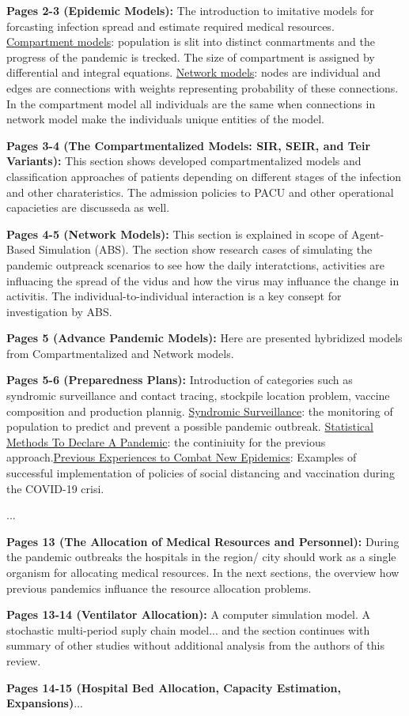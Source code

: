     \textbf{Pages 2-3 (Epidemic Models):}
    The introduction to imitative models for forcasting infection spread and estimate required medical resources. \underline{Compartment models}: population is slit into distinct conmartments and the progress of the pandemic is trecked. The size of compartment is assigned by differential and integral equations. \underline{Network models}: nodes are individual and edges are connections with weights representing probability of these connections. In the compartment model all individuals are the same when connections in network model make the individuals unique entities of the model.

    \textbf{Pages 3-4 (The Compartmentalized Models: SIR, SEIR, and Teir Variants):} 
    This section shows developed compartmentalized models and classification approaches of patients depending on different stages of the infection and other charateristics. The admission policies to PACU and other operational capacieties are discusseda as well.

    \textbf{Pages 4-5 (Network Models):} 
    This section is explained in scope of Agent-Based Simulation (ABS). The section show research cases of simulating the pandemic outpreack scenarios to see how the daily interatctions, activities are influacing the spread of the vidus and how the virus may influance the change in activitis. The individual-to-individual interaction is a key consept for investigation by ABS.
    
    \textbf{Pages 5 (Advance Pandemic Models):}
    Here are presented hybridized models from Compartmentalized and Network models. 
    
    \textbf{Pages 5-6 (Preparedness Plans):}
    Introduction of categories such as syndromic surveillance and contact tracing, stockpile location problem, vaccine composition and production plannig. \underline{Syndromic Surveillance}: the monitoring of population to predict and prevent a possible pandemic outbreak. \underline{Statistical Methods To Declare A Pandemic}: the continiuity for the previous approach.\underline{Previous Experiences to Combat New Epidemics}: Examples of successful implementation of policies of social distancing and vaccination during the COVID-19 crisi.
    
    ...
    
    
    \textbf{Pages 13 (The Allocation of Medical Resources and Personnel):}
    During the pandemic outbreaks the hospitals in the region/ city should work as a single organism for allocating medical resources. In the next sections, the overview how previous pandemics influance the resource allocation problems.
    
    \textbf{Pages 13-14 (Ventilator Allocation):}
    A computer simulation model. A stochastic multi-period suply chain model... and the section continues with summary of other studies without additional analysis from the authors of this review.

    \textbf{Pages 14-15 (Hospital Bed Allocation, Capacity Estimation, Expansions)}... 